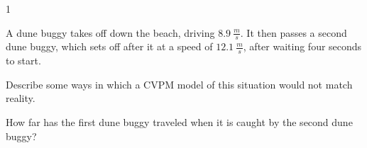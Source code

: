 
\AddToShipoutPicture*{\BackgroundPic}

\addtocounter {ProbNum} {1}

 
{\bf \Large{}}A dune buggy takes off down the beach, driving ${8.9~\tfrac{m}{s}}$.  It then passes a second dune buggy, which sets off after it at a speed of ${12.1~\tfrac{m}{s}}$, after waiting four seconds to start.

\bigskip
Describe some ways in which a CVPM model of this situation would not match reality.

\vspace{30 mm}
How far has the first dune buggy traveled when it is caught by the second dune buggy?

 
\vfill

\newpage